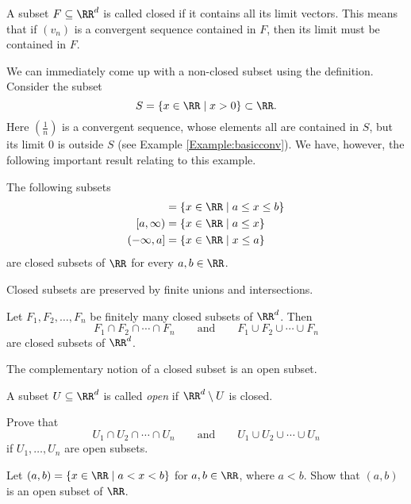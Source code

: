 \documentclass{article}
\begin{document}
\begin{definition}[emph]
A subset $F\subseteq \RR^d$ is called closed if it contains all its limit vectors. This
means that if $(v_n)$ is a convergent sequence contained in $F$, then its limit must
be contained in $F$.
\end{definition}




We can immediately come up with a non-closed subset using the definition. Consider the subset
$$
S = \{x\in \RR \mid x > 0\}\subset \RR.
$$
Here $\left(\frac{1}{n}\right)$ is a convergent sequence, whose elements all are
contained in $S$, but its limit $0$ is outside $S$ (see Example
\ref{Example:basicconv}).
We have, however, the following important result relating to this example.

\begin{proposition}[emph]\label{closedinR}
  The following subsets
  \begin{align*}
    [a, b] &= \{x\in \RR \mid a \leq x \leq b\} \\
    [a, \infty) &= \{x\in \RR \mid a \leq x\}\\
    (-\infty, a] &= \{x\in \RR \mid x \leq a\}
  \end{align*}
  are closed subsets of $\RR$ for every $a, b\in \RR$.
\end{proposition}

Closed subsets are preserved by finite unions and intersections.

\begin{proposition}[emph]
  Let $F_1, F_2, \dots, F_n$ be finitely many closed subsets of $\RR^d$. Then 
  $$
  F_1 \cap F_2 \cap \cdots \cap F_n \qquad\text{and}\qquad
  F_1 \cup F_2 \cup \cdots \cup F_n 
  $$
  are closed subsets of $\RR^d$.
\end{proposition}

The complementary notion of a closed subset is an open subset.


\begin{definition}[emph]
  A subset $U\subseteq \RR^d$ is called \emph{open} if $\RR^d\setminus U$ is closed.
\end{definition}

\beginshex
Prove that 
  $$
  U_1 \cap U_2 \cap \cdots \cap U_n \qquad\text{and}\qquad
  U_1 \cup U_2 \cup \cdots \cup U_n 
  $$
if $U_1, \dots, U_n$ are open subsets.
\endshex

  \beginshex
  Let $(a, b) =\{x \in \RR \mid a < x < b\}$ for $a, b\in \RR$, where $a < b$.
  Show that $(a, b)$ is an open subset of $\RR$.
  \endshex
\end{document}
